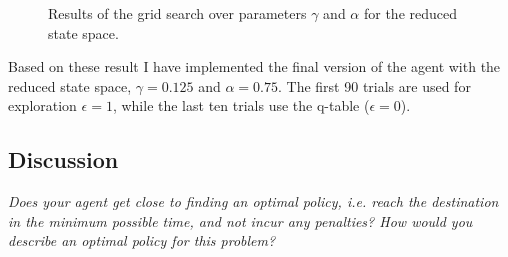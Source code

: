 \documentclass[11pt]{article}
\begin{document}
\begin{figure}[ht]
    \centering
    \caption{Results of the grid search over parameters $\gamma$ and $\alpha$ for the reduced state space.}
    \label{fig:reduced_state_space}
\end{figure}

Based on these result I have implemented the final version of the agent with the reduced state space, $\gamma = 0.125$ and $\alpha = 0.75$. The first 90 trials are used for exploration $\epsilon = 1$, while the last ten trials use the q-table ($\epsilon = 0$).

\subsection{Discussion}
\textit{Does your agent get close to finding an optimal policy, i.e. reach the destination in the minimum possible time, and not incur any penalties? How would you describe an optimal policy for this problem?}
\end{document}
